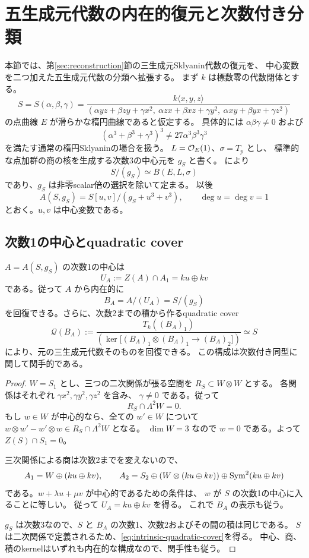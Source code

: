 \section{五生成元代数の内在的復元と次数付き分類}\label{sec:five-generator}

本節では、第\ref{sec:reconstruction}節の三生成元Sklyanin代数の復元を、
中心変数を二つ加えた五生成元代数の分類へ拡張する。
まず $k$ は標数零の代数閉体とする。
\[
 S=S(\alpha,\beta,\gamma)
 =\frac{k\langle x,y,z\rangle}
 {(\alpha yz+\beta zy+\gamma x^2,\
   \alpha zx+\beta xz+\gamma y^2,\
   \alpha xy+\beta yx+\gamma z^2)}
\]
の点曲線 $E$ が滑らかな楕円曲線であると仮定する。
具体的には $\alpha\beta\gamma\ne0$ および
\[
 (\alpha^3+\beta^3+\gamma^3)^3\ne27\alpha^3\beta^3\gamma^3
\]
を満たす通常の楕円Sklyaninの場合を扱う。
$L=\mathcal O_E(1)$、$\sigma=T_p$ とし、
標準的な点加群の商の核を生成する次数3の中心元を $g_S$ と書く。
\cite[Definition--Lemma 2.13, Lemma 2.19]{WWY}により
\[
 S/(g_S)\simeq B(E,L,\sigma)
\]
であり、$g_S$ は非零scalar倍の選択を除いて定まる。
以後
\[
 A(S,g_S)=S[u,v]/(g_S+u^3+v^3),\qquad \deg u=\deg v=1
\]
とおく。$u,v$ は中心変数である。

\subsection{次数1の中心とquadratic cover}

\begin{theorem}[中心平面からのSklyanin代数の復元]\label{thm:intrinsic-sklyanin}
$A=A(S,g_S)$ の次数1の中心は
\[
 U_A:=Z(A)\cap A_1=ku\oplus kv
\]
である。従って $A$ から内在的に
\[
 B_A=A/(U_A)=S/(g_S)
\]
を回復できる。さらに、次数2までの積から作るquadratic cover
\begin{equation}\label{eq:intrinsic-quadratic-cover}
 \mathcal Q(B_A):=
 \frac{T_k((B_A)_1)}
 {\left(\ker\bigl[(B_A)_1\otimes(B_A)_1\longrightarrow(B_A)_2\bigr]\right)}
 \simeq S
\end{equation}
により、元の三生成元代数そのものを回復できる。
この構成は次数付き同型に関して関手的である。
\end{theorem}

\begin{proof}
$W=S_1$ とし、三つの二次関係が張る空間を $R_S\subset W\otimes W$ とする。
各関係はそれぞれ $\gamma x^2,\gamma y^2,\gamma z^2$ を含み、
$\gamma\ne0$ である。従って
\[
 R_S\cap\Lambda^2W=0.
\]
もし $w\in W$ が中心的なら、全ての $w'\in W$ について
$w\otimes w'-w'\otimes w\in R_S\cap\Lambda^2W$ となる。
$\dim W=3$ なので $w=0$ である。よって $Z(S)\cap S_1=0$。

三次関係による商は次数2までを変えないので、
\[
 A_1=W\oplus(ku\oplus kv),\qquad
 A_2=S_2\oplus(W\otimes(ku\oplus kv))\oplus\operatorname{Sym}^2(ku\oplus kv)
\]
である。$w+\lambda u+\mu v$ が中心的であるための条件は、
$w$ が $S$ の次数1の中心に入ることに等しい。
従って $U_A=ku\oplus kv$ を得る。
これで $B_A$ の表示も従う。

$g_S$ は次数3なので、$S$ と $B_A$ の次数1、次数2およびその間の積は同じである。
$S$ は二次関係で定義されるため、\eqref{eq:intrinsic-quadratic-cover}を得る。
中心、商、積のkernelはいずれも内在的な構成なので、関手性も従う。
\end{proof}

